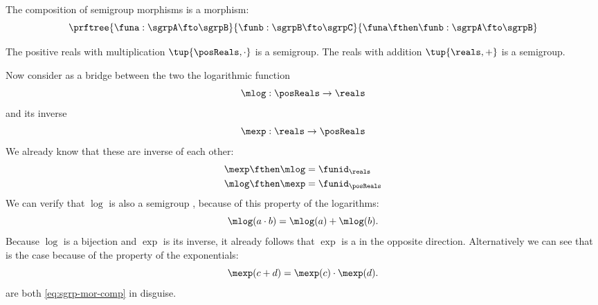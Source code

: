 \begin{lemma}\label{lem:semigroup-morphisms-compose}
The composition of semigroup morphisms is a morphism:
\begin{equation}\label{eq:sgrp-mor-compo}
\prftree{\funa  : \sgrpA \fto \sgrpB}{\funb : \sgrpB \fto \sgrpC}{
\funa \fthen \funb  : \sgrpA \fto \sgrpB}
\end{equation}
\end{lemma}
\devel{
\begin{forslides}
\begin{equation}\label{eq:sgrp-posreals-mult}
\tup{\posReals, \cdot}
\end{equation}

\begin{equation}\label{eq:sgrp-reals-plus}
\tup{\reals, +}
\end{equation}
\end{forslides}
}%
\begin{example}
    The positive reals with multiplication  $\tup{\posReals, \cdot}$ is a semigroup.
    The reals with addition $\tup{\reals, +}$ is a semigroup.

    Now consider as a bridge between the two the logarithmic function
    \begin{equation} \label{eq:log}
        \mlog :  \posReals \to \reals
    \end{equation}
    and its inverse
    \begin{equation}\label{eq:exp}
        \mexp :  \reals \to \posReals
    \end{equation}
    We already know that these are inverse of each other:
    \begin{equation}
    \begin{aligned}
        \mexp \fthen \mlog &= \funid_{\reals} \\
        \mlog \fthen \mexp &= \funid_{\posReals}
        \end{aligned}
    \end{equation}
    We can verify that $\log$ is also a semigroup \whomo, because of this property of the logarithms:
    \begin{equation} \label{eq:log-property}
        \mlog(a \cdot b) = \mlog(a) + \mlog(b).
    \end{equation}
    Because $\log$ is a bijection and $\exp$ is its inverse, it already follows that $\exp$ is
    a \whomo in the opposite direction. Alternatively we can see that is the case because of the property of the exponentials:
    \begin{equation} \label{eq:exp-property}
        \mexp(c + d) = \mexp(c) \cdot \mexp(d).
    \end{equation}
     are both \cref{eq:sgrp-mor-comp} in disguise.
\end{example}

